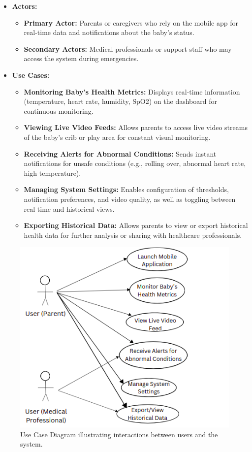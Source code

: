 \documentclass[12pt,a4paper]{report}
\begin{document}
\begin{itemize}
  \item \textbf{Actors:}
        \begin{itemize}
          \item \textbf{Primary Actor:} Parents or caregivers who rely on the mobile app for real-time data and notifications about the baby's status.
          \item \textbf{Secondary Actors:} Medical professionals or support staff who may access the system during emergencies.
        \end{itemize}

  \item \textbf{Use Cases:}
        \begin{itemize}
          \item \textbf{Monitoring Baby’s Health Metrics:} Displays real-time information (temperature, heart rate, humidity, SpO2) on the dashboard for continuous monitoring.
          \item \textbf{Viewing Live Video Feeds:} Allows parents to access live video streams of the baby’s crib or play area for constant visual monitoring.
          \item \textbf{Receiving Alerts for Abnormal Conditions:} Sends instant notifications for unsafe conditions (e.g., rolling over, abnormal heart rate, high temperature).
          \item \textbf{Managing System Settings:} Enables configuration of thresholds, notification preferences, and video quality, as well as toggling between real-time and historical views.
          \item \textbf{Exporting Historical Data:} Allows parents to view or export historical health data for further analysis or sharing with healthcare professionals.
        \end{itemize}
\end{itemize}

\begin{figure}[hbtp]
  \centering
  \includegraphics[scale=0.6]{./pic/usercase.png}
  \caption{Use Case Diagram illustrating interactions between users and the system.}
  \label{fig:usecase}
\end{figure}
\end{document}
